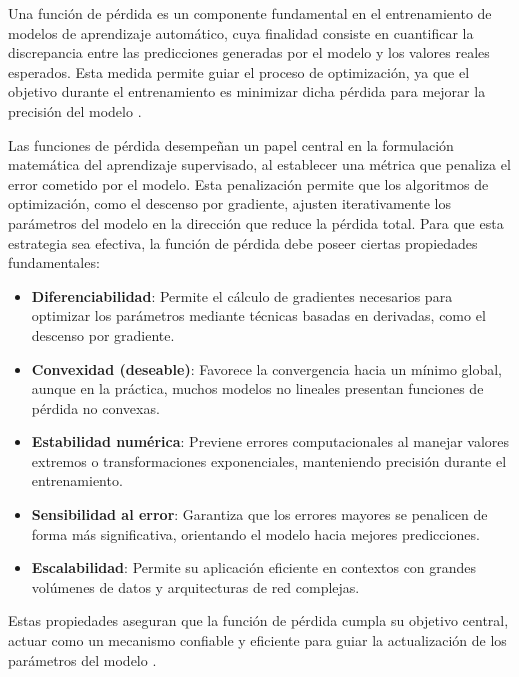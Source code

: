Una función de pérdida es un componente fundamental en el entrenamiento de modelos de aprendizaje automático, cuya finalidad consiste en cuantificar la discrepancia entre las predicciones generadas por el modelo y los valores reales esperados. Esta medida permite guiar el proceso de optimización, ya que el objetivo durante el entrenamiento es minimizar dicha pérdida para mejorar la precisión del modelo \cite{eitca_loss_function}.

Las funciones de pérdida desempeñan un papel central en la formulación matemática del aprendizaje supervisado, al establecer una métrica que penaliza el error cometido por el modelo. Esta penalización permite que los algoritmos de optimización, como el descenso por gradiente, ajusten iterativamente los parámetros del modelo en la dirección que reduce la pérdida total. Para que esta estrategia sea efectiva, la función de pérdida debe poseer ciertas propiedades fundamentales:

\begin{itemize}

    \item\textbf{Diferenciabilidad}: Permite el cálculo de gradientes necesarios para optimizar los parámetros mediante técnicas basadas en derivadas, como el descenso por gradiente.

    \item\textbf{Convexidad (deseable)}: Favorece la convergencia hacia un mínimo global, aunque en la práctica, muchos modelos no lineales presentan funciones de pérdida no convexas.

    \item\textbf{Estabilidad numérica}: Previene errores computacionales al manejar valores extremos o transformaciones exponenciales, manteniendo precisión durante el entrenamiento.

 	\item\textbf{Sensibilidad al error}: Garantiza que los errores mayores se penalicen de forma más significativa, orientando el modelo hacia mejores predicciones.

	\item\textbf{Escalabilidad}: Permite su aplicación eficiente en contextos con grandes volúmenes de datos y arquitecturas de red complejas.

\end{itemize}

Estas propiedades aseguran que la función de pérdida cumpla su objetivo central, actuar como un mecanismo confiable y eficiente para guiar la actualización de los parámetros del modelo \cite{ultralytics_loss_function}.

